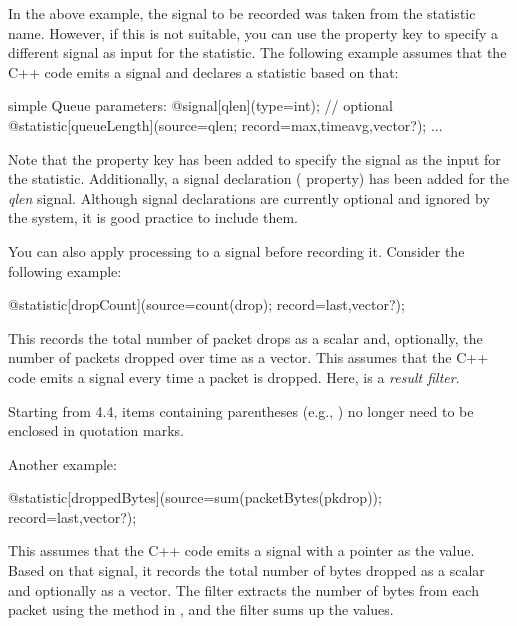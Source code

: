 In the above example, the signal to be recorded was taken from the
statistic name. However, if this is not suitable, you can use the
 property key to specify a different signal as input for the
statistic. The following example assumes that the C++ code emits a 
signal and declares a  statistic based on that:

\begin{ned}
simple Queue
{
    parameters:
        @signal[qlen](type=int); // optional
        @statistic[queueLength](source=qlen; record=max,timeavg,vector?);
        ...
}
\end{ned}

Note that the  property key has been added to specify
the  signal as the input for the statistic. Additionally, a
signal declaration ( property) has been added for the
\textit{qlen} signal. Although signal declarations are currently optional
and ignored by the system, it is good practice to include them.

You can also apply processing to a signal before recording it. Consider
the following example:

\begin{ned}
@statistic[dropCount](source=count(drop); record=last,vector?);
\end{ned}

This records the total number of packet drops as a scalar and, optionally,
the number of packets dropped over time as a vector. This assumes that the
C++ code emits a  signal every time a packet is dropped.
Here,  is a \textit{result filter}.

\begin{note}
Starting from {\opp} 4.4, items containing parentheses (e.g.,
) no longer need to be enclosed in quotation marks.
\end{note}

Another example:

\begin{ned}
@statistic[droppedBytes](source=sum(packetBytes(pkdrop)); record=last,vector?);
\end{ned}

This assumes that the C++ code emits a  signal with a
 pointer as the value. Based on that signal, it records
the total number of bytes dropped as a scalar and optionally as a vector.
The  filter extracts the number of bytes from each packet
using the  method in , and the
 filter sums up the values.

